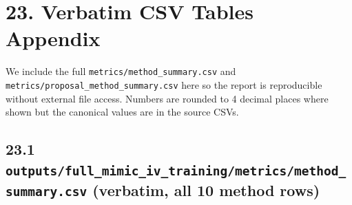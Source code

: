 \documentclass{article}
\begin{document}
\clearpage
\section{23. Verbatim CSV Tables Appendix}


We include the full \texttt{metrics/method\_summary.csv} and \texttt{metrics/proposal\_method\_summary.csv} here so the report is reproducible without external file access. Numbers are rounded to 4 decimal places where shown but the canonical values are in the source CSVs.


\subsection{23.1 \texttt{outputs/full\_mimic\_iv\_training/metrics/method\_summary.csv} (verbatim, all 10 method rows)}
\end{document}

